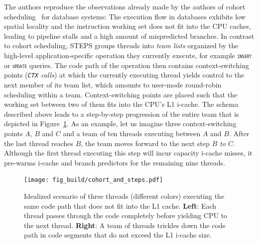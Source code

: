 \documentclass[12pt,a4paper]{book}
\begin{document}
The authors reproduce the observations already made by the authors of cohort scheduling~\cite{cohort} for database systems:
The execution flow in databases exhibits low spatial locality and the instruction working set does not fit into the CPU caches, leading to pipeline stalls and a high amount of mispredicted branches.
In contrast to cohort scheduling, STEPS groups threads into \emph{team lists} organized by the high-level application-specific operation they currently execute, for example \texttt{\textsc{insert}} or \texttt{\textsc{update}} queries.
The code path of the operation then contains context-switching points (\textit{\texttt{CTX} calls}) at which the currently executing thread yields control to the next member of its team list, which amounts to user-mode round-robin scheduling within a team.
Context-switching points are placed such that the working set between two of them fits into the CPU's L1 i-cache.
The schema described above leads to a step-by-step progression of the entire team that is depicted in Figure~\ref{fig:cohort_and_steps}.
As an example, let us imagine three context-switching points $A$, $B$ and $C$ and a team of ten threads executing between $A$ and $B$.
After the last thread reaches $B$, the team moves forward to the next step  \textit{$B$ to $C$}.
Although the first thread executing this step will incur capacity i-cache misses, it pre-warms i-cache and branch predictors for the remaining nine threads.~\cite{steps}

\begin{figure}[h]
    \centering
    \texttt{[image: fig\_build/cohort\_and\_steps.pdf]}
    \caption{
        Idealized scenario of three threads (different colors) executing the same code path that does not fit into the L1 cache.
        \textbf{Left}: Each thread passes through the code completely before yielding CPU to the next thread.
        \textbf{Right}: A team of threads trickles down the code path in code segments that do not exceed the L1 i-cache size.
    }
    \label{fig:cohort_and_steps}
\end{figure}
\end{document}
